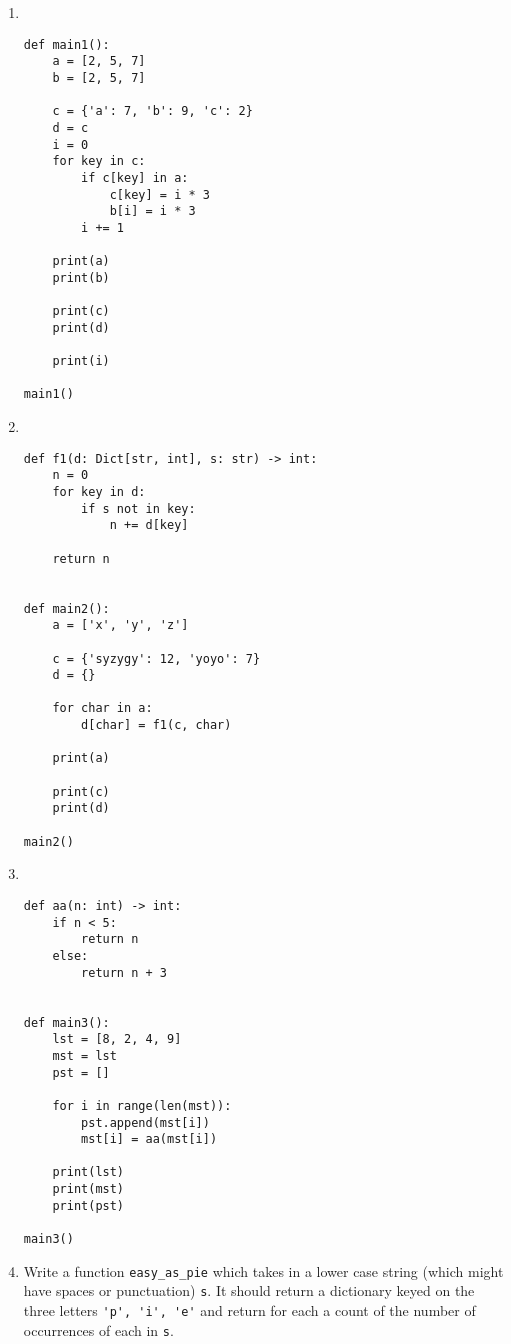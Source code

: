 \documentclass{article}
\begin{document}
\begin{enumerate}

\item \
\begin{verbatim}
def main1():
    a = [2, 5, 7]
    b = [2, 5, 7]

    c = {'a': 7, 'b': 9, 'c': 2}
    d = c
    i = 0
    for key in c:
        if c[key] in a:
            c[key] = i * 3
            b[i] = i * 3
        i += 1

    print(a)
    print(b)

    print(c)
    print(d)

    print(i)

main1()
\end{verbatim}




\newpage

\item \
\begin{verbatim}
def f1(d: Dict[str, int], s: str) -> int:
    n = 0
    for key in d:
        if s not in key:
            n += d[key]

    return n


def main2():
    a = ['x', 'y', 'z']

    c = {'syzygy': 12, 'yoyo': 7}
    d = {}

    for char in a:
        d[char] = f1(c, char)

    print(a)

    print(c)
    print(d)

main2()\end{verbatim}

\newpage
\item \

\begin{verbatim}
def aa(n: int) -> int:
    if n < 5:
        return n
    else:
        return n + 3


def main3():
    lst = [8, 2, 4, 9]
    mst = lst
    pst = []

    for i in range(len(mst)):
        pst.append(mst[i])
        mst[i] = aa(mst[i])

    print(lst)
    print(mst)
    print(pst)

main3()
\end{verbatim}

\eject
\item Write a function \verb|easy_as_pie| which takes in a lower case string (which might have spaces or punctuation) \verb|s|. It should return a dictionary keyed on the three letters \verb|'p', 'i', 'e'| and return for each a count of the number of occurrences of each in \verb|s|.


\end{enumerate}
\end{document}
